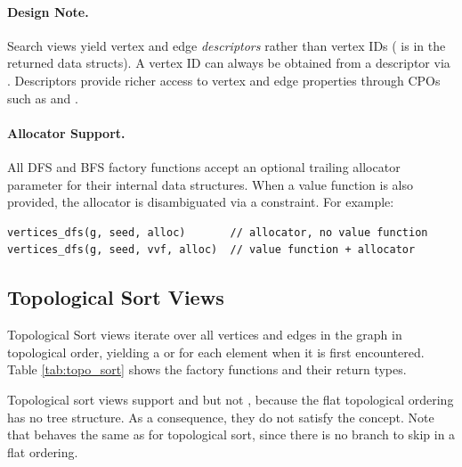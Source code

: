 \paragraph{Design Note.}
Search views yield vertex and edge \emph{descriptors} rather than vertex IDs ( is  in the returned data structs). A vertex ID can always be obtained from a descriptor via . Descriptors provide richer access to vertex and edge properties through CPOs such as  and .

\paragraph{Allocator Support.}
All DFS and BFS factory functions accept an optional trailing allocator parameter for their internal data structures. When a value function is also provided, the allocator is disambiguated via a  constraint. For example:
\begin{lstlisting}
vertices_dfs(g, seed, alloc)       // allocator, no value function
vertices_dfs(g, seed, vvf, alloc)  // value function + allocator
\end{lstlisting}

\subsection{Topological Sort Views}
Topological Sort views iterate over all vertices and edges in the graph in topological order, yielding a  or  for each element when it is first encountered. Table \ref{tab:topo_sort} shows the factory functions and their return types.

Topological sort views support  and  but not , because the flat topological ordering has no tree structure. As a consequence, they do not satisfy the  concept. Note that  behaves the same as  for topological sort, since there is no branch to skip in a flat ordering.

